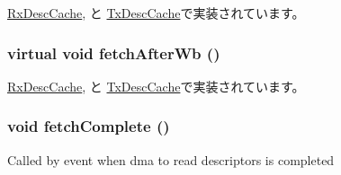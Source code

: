 \hyperlink{classIGbE_1_1RxDescCache_aec7fdcc540223076999e0f8f07f854bc}{RxDescCache}, と \hyperlink{classIGbE_1_1TxDescCache_aec7fdcc540223076999e0f8f07f854bc}{TxDescCache}で実装されています。\hypertarget{classIGbE_1_1DescCache_abe568c102619a35d2aa1a37c64dff086}{
\subsubsection[{fetchAfterWb}]{\setlength{\rightskip}{0pt plus 5cm}virtual void fetchAfterWb ()}}
\label{classIGbE_1_1DescCache_abe568c102619a35d2aa1a37c64dff086}


\hyperlink{classIGbE_1_1RxDescCache_abb8070fbcfa38a9697d92bbc4a0b6505}{RxDescCache}, と \hyperlink{classIGbE_1_1TxDescCache_abb8070fbcfa38a9697d92bbc4a0b6505}{TxDescCache}で実装されています。\hypertarget{classIGbE_1_1DescCache_a23b4635f3979b87b52d2324c4d7ab39a}{
\subsubsection[{fetchComplete}]{\setlength{\rightskip}{0pt plus 5cm}void fetchComplete ()}}
\label{classIGbE_1_1DescCache_a23b4635f3979b87b52d2324c4d7ab39a}
Called by event when dma to read descriptors is completed 


